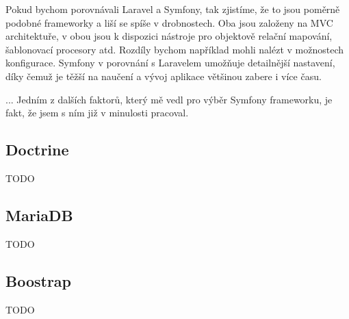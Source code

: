 Pokud bychom porovnávali Laravel a Symfony, tak zjistíme, že to jsou poměrně podobné frameworky a liší se spíše v drobnostech. Oba jsou založeny na MVC architektuře, v obou jsou k dispozici nástroje pro objektově relační mapování, šablonovací procesory atd. Rozdíly bychom například mohli nalézt v možnostech konfigurace. Symfony v porovnání s Laravelem umožňuje detailnější nastavení, díky čemuž je těžší na naučení a vývoj aplikace většinou zabere i více času.\cite{symfony_laravel_comparison}


... Jedním z dalších faktorů, který mě vedl pro výběr Symfony frameworku, je fakt, že jsem s ním již v minulosti pracoval.

\subsection{Doctrine}
TODO

\subsection{MariaDB}
TODO

\subsection{Boostrap}
TODO
